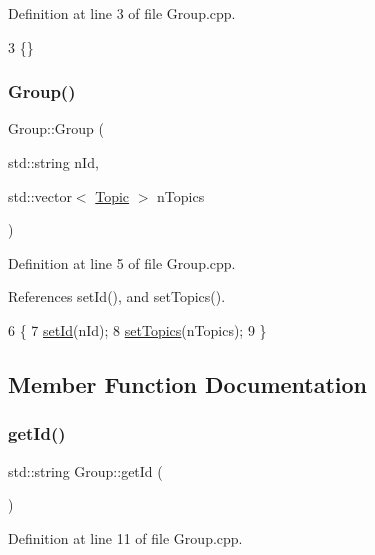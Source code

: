 Definition at line 3 of file Group.\+cpp.


\begin{DoxyCode}
3 \{\}
\end{DoxyCode}
\mbox{\label{class_group_ac3639ca791bff4ceeaeba9e3fe4c1835}} 
\subsubsection{\texorpdfstring{Group()}{Group()}\hspace{0.1cm}{\footnotesize\ttfamily [2/2]}}
{\footnotesize\ttfamily Group\+::\+Group (\begin{DoxyParamCaption}\item[{std\+::string}]{n\+Id,  }\item[{std\+::vector$<$ \hyperlink{class_topic}{Topic} $>$}]{n\+Topics }\end{DoxyParamCaption})}



Definition at line 5 of file Group.\+cpp.



References set\+Id(), and set\+Topics().


\begin{DoxyCode}
6 \{
7     \hyperlink{class_group_aba314538b0284ebfdf2e89fcdeef8697}{setId}(nId);
8     \hyperlink{class_group_ab37f8ac624dedf6eb84e2603e9c51df2}{setTopics}(nTopics);
9 \}
\end{DoxyCode}


\subsection{Member Function Documentation}
\mbox{\label{class_group_ac28178935f780582ce7f5f518d43b6f8}} 
\subsubsection{\texorpdfstring{get\+Id()}{getId()}}
{\footnotesize\ttfamily std\+::string Group\+::get\+Id (\begin{DoxyParamCaption}{ }\end{DoxyParamCaption})}



Definition at line 11 of file Group.\+cpp.




